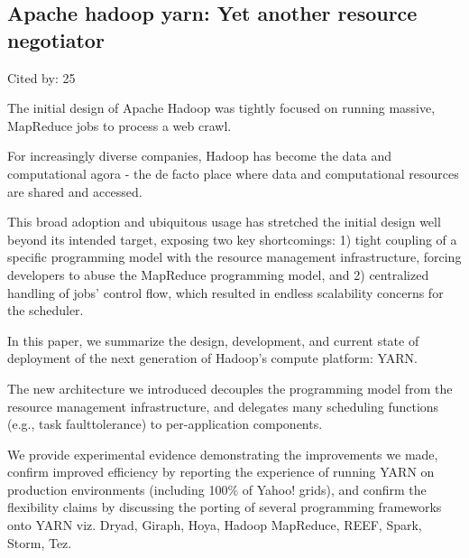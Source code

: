 \documentclass[a4paper,11pt]{article}
\begin{document}
\subsection*{Apache hadoop yarn: Yet another resource negotiator}
{\color{cyan} {\color{magenta} Cited by: 25}

The initial design of Apache Hadoop was tightly focused on 
running massive, MapReduce jobs 
to process a web crawl. 

For increasingly diverse companies, 
Hadoop has become the data and computational agora - 
the de facto place where data and computational resources are shared and accessed. 

This broad adoption and ubiquitous usage has stretched the initial design well beyond its intended target, 
exposing two key shortcomings: 
1) tight coupling of a specific programming model with the resource management infrastructure, 
forcing developers to abuse the MapReduce programming model, and 
2) centralized handling of jobs' control flow, 
which resulted in endless scalability concerns for the scheduler.

In this paper, 
we summarize the 
design, development, and current state of deployment of 
the next generation of Hadoop's compute platform: 
{\color{black} YARN\cite{yarn}}. 

The new architecture we introduced 
decouples the programming model from the resource management infrastructure, and
delegates many scheduling functions (e.g., task faulttolerance)
to per-application components. 

We provide
experimental evidence demonstrating the improvements we made, 
confirm improved efficiency by reporting the experience of running YARN on production environments
(including 100\% of Yahoo! grids), and 
confirm the flexibility claims 
by discussing the porting of several programming frameworks onto YARN viz. 
Dryad, Giraph, Hoya, Hadoop MapReduce, REEF, Spark, Storm, Tez.

}
\end{document}
